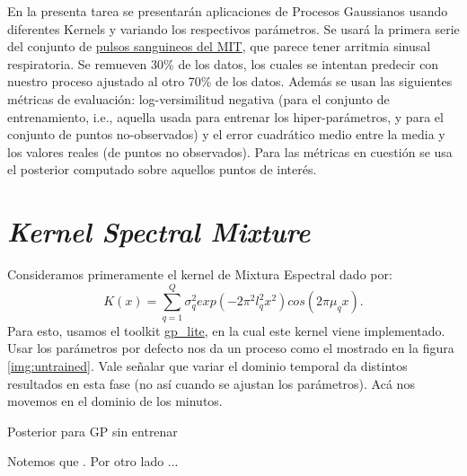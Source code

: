 \documentclass[letterpaper,11pt,oneside]{article}
\theoremstyle{break}
\begin{document}
	





\inserttitle

En la presenta tarea se presentarán aplicaciones de Procesos Gaussianos usando diferentes Kernels y variando los respectivos parámetros. Se usará la primera serie del conjunto de \href{https://ecg.mit.edu/time-series/}{pulsos sanguineos del MIT}, que parece tener arritmia sinusal respiratoria. Se remueven 30\% de los datos, los cuales se intentan predecir con nuestro proceso ajustado al otro 70\% de los datos. Además se usan las siguientes métricas de evaluación: log-versimilitud negativa (para el conjunto de entrenamiento, i.e., aquella usada para entrenar los hiper-parámetros, y para el conjunto de puntos no-observados) y el error cuadrático medio entre la media y los valores reales (de puntos no observados). Para las métricas en cuestión se usa el posterior computado sobre aquellos puntos de interés.

\section{\textit{Kernel Spectral Mixture}}
Consideramos primeramente el kernel de Mixtura Espectral dado por: 
$$K(x)=\displaystyle \sum^Q_{q=1}\sigma^2_q exp(-2\pi^2l^2_qx^2)cos(2\pi\mu_qx).$$
Para esto, usamos el toolkit \href{https://github.com/GAMES-UChile/The_Art_of_Gaussian_Processes}{gp\_lite}, en la cual este kernel viene implementado. Usar los parámetros por defecto nos da un proceso como el mostrado en la figura \ref{img:untrained}. Vale señalar que variar el dominio temporal da distintos resultados en esta fase (no así cuando se ajustan los parámetros). Acá nos movemos en el dominio de los minutos.

\begin{images}[\label{img:untrained}]{Posterior para GP sin entrenar}
\end{images}

Notemos que \lipsum[1]. Por otro lado ...

\end{document}

